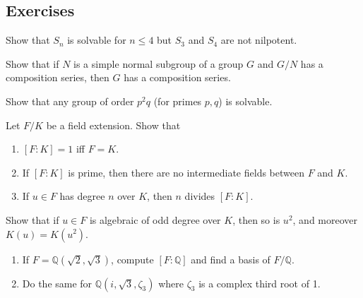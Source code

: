 
\subsection{Exercises}
\begin{problem}[Hungerford 2.7.10]
\label{prob:1.1}
Show that $S_n$ is solvable for $n\leq 4$ but $S_3$ and $S_4$ are not nilpotent.
\end{problem}

\begin{problem}[Hungerford 2.8.3]
\label{prob:1.1}
Show that if $N$ is a simple normal subgroup of a group $G$ and $G/N$ has a composition series, then $G$ has a composition series.
\end{problem}

\begin{problem}[Hungerford 2.8.9]
\label{prob:1.1}
Show that any group of order $p^2 q$ (for primes $p,q$) is solvable.
\end{problem}

\begin{problem}[Hungerford 5.1.1]
Let $F/K$ be a field extension. Show that
\begin{enumerate}
    \item $[F: K] = 1$ iff $F = K$.
    \item If $[F: K]$ is prime, then there are no intermediate fields between $F$ and $K$.
    \item If $u\in F$ has degree $n$ over $K$, then $n$ divides $[F: K]$.
\end{enumerate}
\label{prob:1.1}
\end{problem}

\begin{problem}[Hungerford 5.1.8]
\label{prob:1.1}
Show that if $u\in F$ is algebraic of odd degree over $K$, then so is $u^2$, and moreover $K(u) = K(u^2)$.
\end{problem}

\begin{problem}[Hungerford 5.1.14]
\begin{enumerate}
    \item If $F = \mathbb{Q}(\sqrt 2, \sqrt 3)$, compute $[F: \mathbb{Q}]$ and find a basis of $F/\mathbb{Q}$.
    \item Do the same for $\mathbb{Q}(i, \sqrt 3, \zeta_3)$ where $\zeta_3$ is a complex third root of 1.
\end{enumerate}
\label{prob:1.1}
\end{problem}

